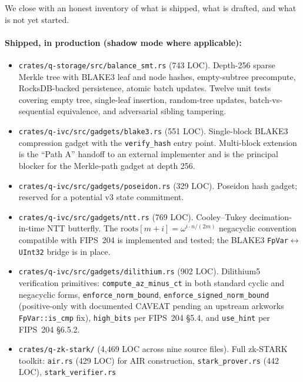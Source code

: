 \documentclass[11pt,a4paper]{article}
\begin{document}
We close with an honest inventory of what is shipped, what is drafted,
and what is not yet started.

\paragraph{Shipped, in production (shadow mode where applicable):}
\begin{itemize}[leftmargin=*]
  \item \texttt{crates/q-storage/src/balance\_smt.rs} (743 LOC).
        Depth-256 sparse Merkle tree with BLAKE3 leaf and node hashes,
        empty-subtree precompute, RocksDB-backed persistence, atomic
        batch updates. Twelve unit tests covering empty tree,
        single-leaf insertion, random-tree updates, batch-vs-sequential
        equivalence, and adversarial sibling tampering.
  \item \texttt{crates/q-ivc/src/gadgets/blake3.rs} (551 LOC).
        Single-block BLAKE3 compression gadget with the
        \texttt{verify\_hash} entry point. Multi-block extension is the
        ``Path A'' handoff to an external implementer and is the
        principal blocker for the Merkle-path gadget at depth 256.
  \item \texttt{crates/q-ivc/src/gadgets/poseidon.rs} (329 LOC).
        Poseidon hash gadget; reserved for a potential v3 state
        commitment.
  \item \texttt{crates/q-ivc/src/gadgets/ntt.rs} (769 LOC).
        Cooley--Tukey decimation-in-time NTT butterfly. The
        $\mathrm{roots}[m+i] = \omega^{i \cdot n / (2m)}$ negacyclic
        convention compatible with FIPS~204 is implemented and
        tested; the BLAKE3 \texttt{FpVar}$\leftrightarrow$\texttt{UInt32}
        bridge is in place.
  \item \texttt{crates/q-ivc/src/gadgets/dilithium.rs} (902 LOC).
        Dilithium5 verification primitives:
        \texttt{compute\_az\_minus\_ct} in both standard cyclic and
        negacyclic forms, \texttt{enforce\_norm\_bound},
        \texttt{enforce\_signed\_norm\_bound} (positive-only with
        documented CAVEAT pending an upstream arkworks
        \texttt{FpVar::is\_cmp} fix), \texttt{high\_bits} per
        FIPS~204 \S5.4, and \texttt{use\_hint} per FIPS~204 \S6.5.2.
  \item \texttt{crates/q-zk-stark/} (4{,}469 LOC across nine source files).
        Full zk-STARK toolkit: \texttt{air.rs} (429 LOC) for AIR construction,
        \texttt{stark\_prover.rs} (442 LOC), \texttt{stark\_verifier.rs}

\end{itemize}
\end{document}
